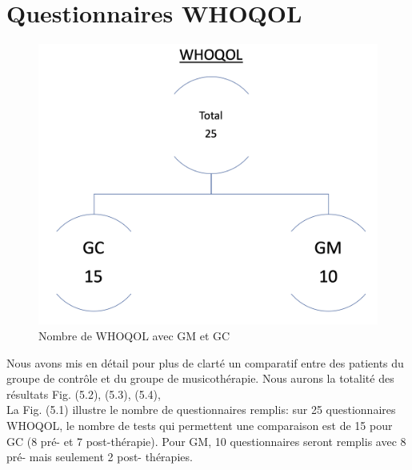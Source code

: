        \section{Questionnaires WHOQOL}
   \begin{figure}[th]
   	\centering
   	\includegraphics[width=0.7\linewidth]{images/TestWQ.png}
   	\caption[Nombre de WHOQOL avec GM et GC]{Nombre de WHOQOL avec GM et GC}
   \end{figure}
   Nous avons mis en détail pour plus de clarté un comparatif entre des patients du 
   groupe de contrôle et du groupe de 
   musicothérapie.  %
    Nous aurons la 
   totalité des 
   résultats Fig. (5.2), (5.3), (5.4),
   	\\
    La Fig. (5.1) illustre le nombre  de questionnaires 
   remplis: sur 25 questionnaires WHOQOL, %
   le nombre de tests qui permettent une comparaison est de  15 pour GC (8 pré-
   et 7 post-thérapie).
   Pour GM, 10 questionnaires seront  remplis
   avec 8  pré- mais seulement 2
   post- thérapies.
   
